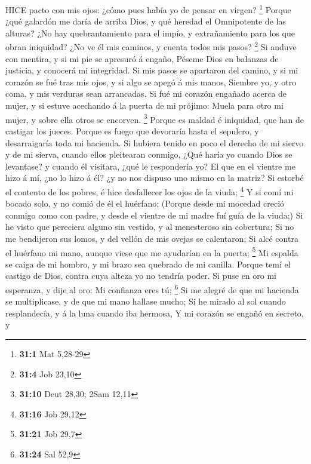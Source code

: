  HICE pacto con mis ojos: ¿cómo pues había yo de pensar en
virgen? \footnote{\textbf{31:1} Mat 5,28-29}  Porque ¿qué
galardón me daría de arriba Dios, y qué heredad el Omnipotente de las
alturas?  ¿No hay quebrantamiento para el impío, y
extrañamiento para los que obran iniquidad?  ¿No ve él mis
caminos, y cuenta todos mis pasos? \footnote{\textbf{31:4} Job 23,10}
 Si anduve con mentira, y si mi pie se apresuró á engaño,
 Péseme Dios en balanzas de justicia, y conocerá mi
integridad.  Si mis pasos se apartaron del camino, y si mi
corazón se fué tras mis ojos, y si algo se apegó á mis manos,
 Siembre yo, y otro coma, y mis verduras sean arrancadas.
 Si fué mi corazón engañado acerca de mujer, y si estuve
acechando á la puerta de mi prójimo:  Muela para otro mi
mujer, y sobre ella otros se encorven. \footnote{\textbf{31:10} Deut
  28,30; 2Sam 12,11}  Porque es maldad é iniquidad, que han
de castigar los jueces.  Porque es fuego que devoraría
hasta el sepulcro, y desarraigaría toda mi hacienda.  Si
hubiera tenido en poco el derecho de mi siervo y de mi sierva, cuando
ellos pleitearan conmigo,  ¿Qué haría yo cuando Dios se
levantase? y cuando él visitara, ¿qué le respondería yo? 
El que en el vientre me hizo á mí, ¿no lo hizo á él? ¿y no nos dispuso
uno mismo en la matriz?  Si estorbé el contento de los
pobres, é hice desfallecer los ojos de la viuda; \footnote{\textbf{31:16}
  Job 29,12}  Y si comí mi bocado solo, y no comió de él el
huérfano;  (Porque desde mi mocedad creció conmigo como con
padre, y desde el vientre de mi madre fuí guía de la viuda;)
 Si he visto que pereciera alguno sin vestido, y al
menesteroso sin cobertura;  Si no me bendijeron sus lomos,
y del vellón de mis ovejas se calentaron;  Si alcé contra
el huérfano mi mano, aunque viese que me ayudarían en la puerta;
\footnote{\textbf{31:21} Job 29,7}  Mi espalda se caiga de
mi hombro, y mi brazo sea quebrado de mi canilla.  Porque
temí el castigo de Dios, contra cuya alteza yo no tendría poder.
 Si puse en oro mi esperanza, y dije al oro: Mi confianza
eres tú; \footnote{\textbf{31:24} Sal 52,9}  Si me alegré
de que mi hacienda se multiplicase, y de que mi mano hallase mucho;
 Si he mirado al sol cuando resplandecía, y á la luna
cuando iba hermosa,  Y mi corazón se engañó en secreto, y
